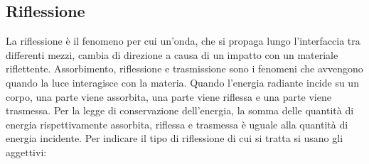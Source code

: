 \subsection{Riflessione} 

La riflessione è il fenomeno per cui un'onda, che si propaga lungo
l'interfaccia tra differenti mezzi, cambia di direzione a causa di un impatto
con un materiale riflettente. Assorbimento, riflessione e trasmissione sono i
fenomeni che avvengono quando la luce interagisce con la materia. Quando
l'energia radiante incide su un corpo, una parte viene assorbita, una parte
viene riflessa e una parte viene trasmessa. Per la legge di conservazione
dell'energia, la somma delle quantità di energia rispettivamente assorbita,
riflessa e trasmessa è uguale alla quantità di energia incidente. Per indicare
il tipo di riflessione di cui si tratta si usano gli aggettivi:

